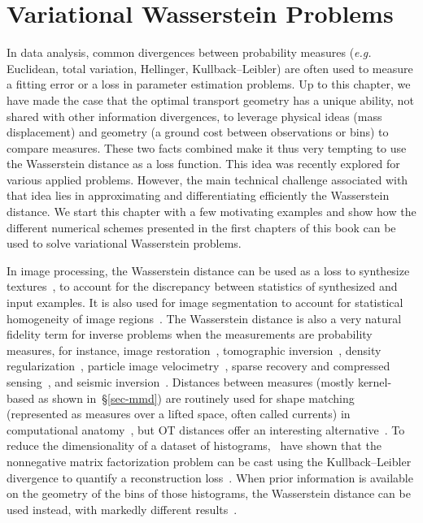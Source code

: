 
\chapter{Variational Wasserstein Problems}
\label{c-variational} %

In data analysis, common divergences between probability measures (\emph{e.g.} Euclidean, total variation, Hellinger, Kullback--Leibler) are often used to measure a fitting error or a loss in parameter estimation problems. Up to this chapter, we have made the case that the optimal transport geometry has a unique ability, not shared with other information divergences, to leverage physical ideas (mass displacement) and geometry (a ground cost between observations or bins) to compare measures. These two facts combined make it thus very tempting to use the Wasserstein distance as a loss function. This idea was recently explored for various applied problems. However, the main technical challenge associated with that idea lies in approximating and differentiating efficiently the Wasserstein distance. We start this chapter with a few motivating examples and show how the different numerical schemes presented in the first chapters of this book can be used to solve variational Wasserstein problems.

In image processing, the Wasserstein distance can be used as a loss to synthesize textures~\citep{2016-tartavel-siims}, to account for the discrepancy between statistics of synthesized and input examples. It is also used for image segmentation to account for statistical homogeneity of image regions~\citep{SchnorSegmentation,RabinPapadakisSSVM,peyre2012wasserstein,ni2009local,schmitzer2013object,liimage}.
%
The Wasserstein distance is also a very natural fidelity term for inverse problems when the measurements are probability measures, for instance, image restoration~\citep{lellmann2014imaging}, tomographic inversion~\citep{AbrahamRadon}, density regularization~\citep{Burger-JKO}, particle image velocimetry~\citep{saumier2015optimal}, sparse recovery and compressed sensing~\citep{indyk2011k}, and seismic inversion~\citep{metivier2016optimal}.
%
Distances between measures (mostly kernel-based as shown in~\S\ref{sec-mmd}) are routinely used for shape matching (represented as measures over a lifted space, often called currents) in computational anatomy~\citep{vaillant2005surface}, but OT distances offer an interesting alternative~\citep{2017-feydy-miccai}. 
% 
To reduce the dimensionality of a dataset of histograms,~\citeauthor{lee1999learning} have shown that the nonnegative matrix factorization problem can be cast using the Kullback--Leibler divergence to quantify a reconstruction loss~\citep{lee1999learning}. When prior information is available on the geometry of the bins of those histograms, the Wasserstein distance can be used instead, with markedly different results~\citep{Sandler09,ZenICPR14,pmlr-v51-rolet16}.

